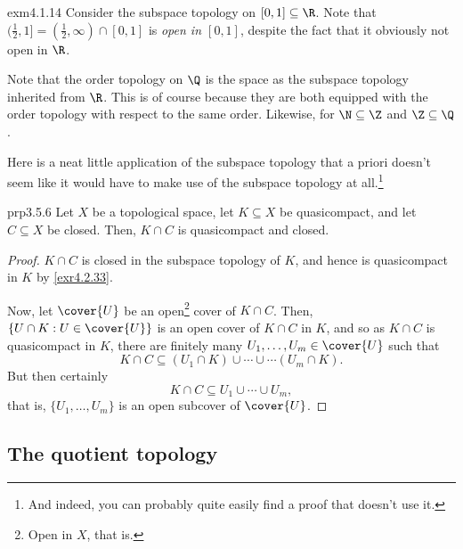 \begin{exm}{}{exm4.1.14}
Consider the subspace topology on $[0,1]\subseteq \R$.  Note that $(\frac{1}{2},1]=(\frac{1}{2},\infty )\cap [0,1]$ is \emph{open in $[0,1]$}, despite the fact that it obviously not open in $\R$.
\end{exm}
\begin{exm}{}{}
Note that the order topology on $\Q$ is the space as the subspace topology inherited from $\R$.  This is of course because they are both equipped with the order topology with respect to the same order.  Likewise, for $\N \subseteq \Z$ and $\Z \subseteq \Q$.
\end{exm}

Here is a neat little application of the subspace topology that a priori doesn't seem like it would have to make use of the subspace topology at all.\footnote{And indeed, you can probably quite easily find a proof that doesn't use it.}
\begin{prp}{}{prp3.5.6}
Let $X$ be a topological space, let $K\subseteq X$ be quasicompact, and let $C\subseteq X$ be closed.  Then, $K\cap C$ is quasicompact and closed.
\begin{proof}
$K\cap C$ is closed in the subspace topology of $K$, and hence is quasicompact in $K$ by \cref{exr4.2.33}.

Now, let $\cover{U}$ be an open\footnote{Open in $X$, that is.} cover of $K\cap C$.  Then, $\left\{ U\cap K:U\in \cover{U}\right\}$ is an open cover of $K\cap C$ in $K$, and so as $K\cap C$ is quasicompact in $K$, there are finitely many $U_1,\ldots ,U_m\in \cover{U}$ such that
\begin{equation}
K\cap C\subseteq (U_1\cap K)\cup \cdots \cup \cdots (U_m\cap K).
\end{equation}
But then certainly
\begin{equation}
K\cap C\subseteq U_1\cup \cdots \cup U_m,
\end{equation}
that is, $\{ U_1,\ldots ,U_m\}$ is an open subcover of $\cover{U}$.
\end{proof}
\end{prp}

\subsection{The quotient topology}

